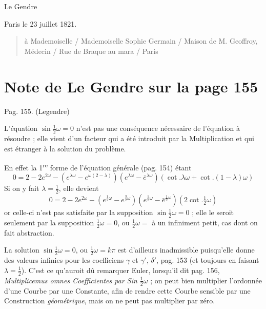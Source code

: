 \documentclass[11pt,a4paper]{article}
\begin{document}
Le Gendre

Paris le 23 juillet 1821.


\begin{quote}
à Mademoiselle / Mademoiselle Sophie Germain / Maison de M. Geoffroy, Médecin /
Rue de Braque au mara / Paris
\end{quote}

\section{Note de Le Gendre sur la page 155}

Pag. 155. (Legendre)

L'équation $\sin \frac{1}{2}\omega = 0$ n'est pas une conséquence nécessaire de
l'équation à résoudre ; elle vient d'un facteur qui a été introduit par la
Multiplication et qui est étranger à la solution du problème.

En effet la 1\textsuperscript{re} forme de l'équation générale (pag. 154) étant
\[
  0 = 2 - 2e^{2\omega}
      - \left(e^{\lambda\omega} - e^{\omega(2-\lambda)}\right)
        \left(e^{\lambda\omega} - \bar{e}^{\lambda\omega}\right)
        \left(\cot.\lambda\omega + \cot.(1-\lambda)\omega\right)
\]
Si on y fait $\lambda = \frac{1}{2}$, elle devient
\[
  0 = 2 - 2e^{2\omega}
      - \left(e^{\frac{1}{2}\omega} - e^{\frac{3}{2}\omega}\right)
        \left(e^{\frac{1}{2}\omega} - \bar{e}^{\frac{1}{2}\omega}\right)
        \left(2\cot.\tfrac{1}{2}\omega\right)
\]
or celle-ci n'est pas satisfaite par la supposition $\sin\frac{1}{2}\omega = 0$ ;
elle le seroit seulement par la supposition \struck{\ill{}}
$\frac{1}{2}\omega = 0$, ou $\frac{1}{2}\omega =$ à un infiniment petit, cas
dont on fait abstraction.

La solution $\sin\frac{1}{2}\omega = 0$, ou $\frac{1}{2}\omega = k\pi$ est
d'ailleurs inadmissible puisqu'elle donne des valeurs infinies pour les
coefficiens $\gamma$ et $\gamma'$, $\delta'$, pag. 153 (et toujours en faisant
$\lambda = \frac{1}{2}$). C'est ce qu'auroit dû remarquer Euler, lorsqu'il dit
pag. 156, \emph{Multiplicemus omnes Coefficientes par Sin
$\frac{1}{2}\omega$} ; on peut bien multiplier l'ordonnée d'une Courbe par une
Constante, afin de rendre cette Courbe sensible par une Construction
\emph{géométrique}, mais on ne peut pas multiplier par zéro.
\end{document}
